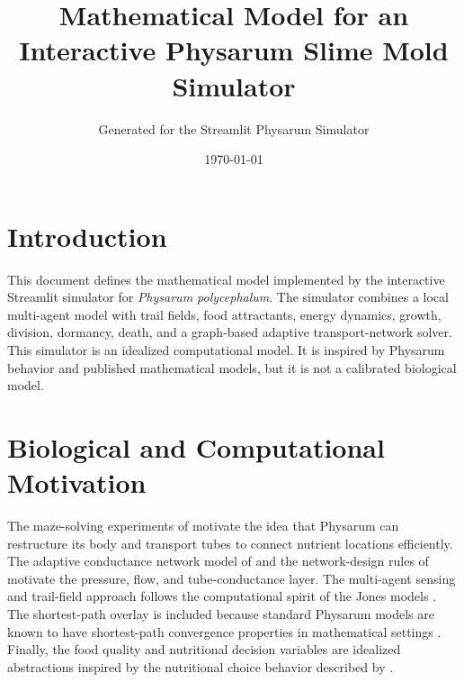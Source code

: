 \documentclass[11pt]{article}
\title{Mathematical Model for an Interactive Physarum Slime Mold Simulator}
\author{Generated for the Streamlit Physarum Simulator}
\date{\today}
\begin{document}
\maketitle

\section{Introduction}
This document defines the mathematical model implemented by the interactive
Streamlit simulator for \emph{Physarum polycephalum}. The simulator combines a
local multi-agent model with trail fields, food attractants, energy dynamics,
growth, division, dormancy, death, and a graph-based adaptive transport-network
solver. This simulator is an idealized computational model. It is inspired by
Physarum behavior and published mathematical models, but it is not a calibrated
biological model.

\section{Biological and Computational Motivation}
The maze-solving experiments of \citet{Nakagaki2000Maze} motivate the idea that
Physarum can restructure its body and transport tubes to connect nutrient
locations efficiently. The adaptive conductance network model of
\citet{Tero2007Adaptive} and the network-design rules of
\citet{Tero2010Rules} motivate the pressure, flow, and tube-conductance layer.
The multi-agent sensing and trail-field approach follows the computational
spirit of the Jones models \citep{Jones2010Pattern,Jones2011Influences}. The
shortest-path overlay is included because standard Physarum models are known to
have shortest-path convergence properties in mathematical settings
\citep{Bonifaci2013Shortest}. Finally, the food quality and nutritional
decision variables are idealized abstractions inspired by the nutritional
choice behavior described by \citet{Dussutour2010Nutrition}.
\end{document}
